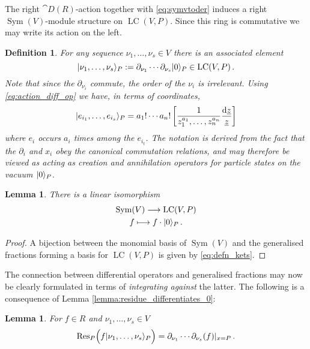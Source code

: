 \documentclass[english,letter paper,12pt,reqno]{article}
\DeclarePairedDelimiter\ket{\lvert}{\rangle}
\newtheorem{lemma}[theorem]{Lemma}
\theoremstyle{example}
\newtheorem{definition}[theorem]{Definition}
\numberwithin{equation}{section}
\DeclareMathOperator{\Sym}{Sym}
\DeclareMathOperator{\LC}{LC}
\begin{document}
The right $\cat{D}(R)$-action together with \eqref{eq:symvtoder} induces a right $\Sym(V)$-module structure on $\LC(V,P)$. Since this ring is commutative we may write its action on the left.

\begin{definition} For any sequence $\nu_1,\ldots,\nu_s \in V$ there is an associated element
\begin{equation}\label{eq:s_particle_state}
\ket{ \nu_1, \ldots, \nu_s }_P := \partial_{\nu_1} \cdots \partial_{\nu_s} \ket{ 0 }_P \in \LC(V,P)\,.
\end{equation}
Note that since the $\partial_{\nu_i}$ commute, the order of the $\nu_i$ is irrelevant. Using \eqref{eq:action_diff_op} we have, in terms of coordinates,
\begin{equation}\label{eq:defn_kets}
\ket{ e_{i_1}, \ldots, e_{i_s} }_P = a_1! \cdots a_n! \left[ \frac{1}{z_1^{a_1}, \ldots, z_n^{a_n}} \frac{\ud{\underline{z}}}{\underline{z}} \right]
\end{equation}
where $e_i$ occurs $a_i$ times among the $e_{i_t}$. The notation is derived from the fact that the $\partial_i$ and $x_i$ obey the canonical commutation relations, and may therefore be viewed as acting as creation and annihilation operators for particle states on the vacuum $\ket{0}_P$.
\end{definition}

\begin{lemma}\label{lemma:iso_fock} There is a linear isomorphism 
\begin{gather*}
\Sym(V) \lto \LC(V, P)\\
f \longmapsto f \cdot \ket{0}_P\,.
\end{gather*}
\end{lemma}
\begin{proof}
A bijection between the monomial basis of $\Sym(V)$ and the generalised fractions forming a basis for $\LC(V,P)$ is given by \eqref{eq:defn_kets}.
\end{proof}

The connection between differential operators and generalised fractions may now be clearly formulated in terms of \emph{integrating against} the latter. The following is a consequence of Lemma \ref{lemma:residue_differentiates_0}:

\begin{lemma}\label{lemma:residue_differentiates} For $f \in R$ and $\nu_1,\ldots,\nu_s \in V$
\begin{equation}\label{eq:residue_differentiates}
\Res_P\Big( f \ket{\nu_1,\ldots,\nu_s}_P \Big) = \partial_{\nu_1} \cdots \partial_{\nu_s}( f )|_{x = P}\,.
\end{equation}
\end{lemma}
\end{document}
